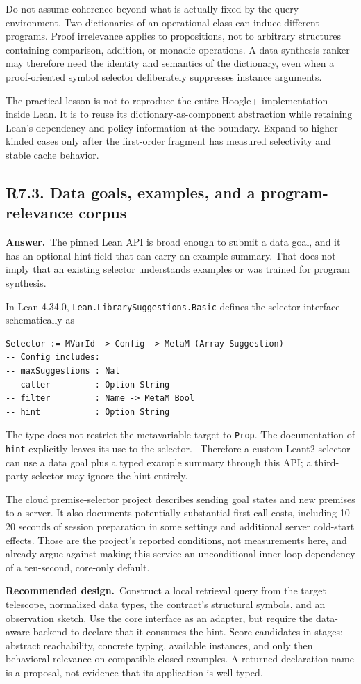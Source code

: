 \documentclass[11pt,a4paper]{article}
\newcommand{\code}[1]{\nolinkurl{#1}}
\newcommand{\qid}[3]{\subsection{#2. #3}\label{#1}}
\newcommand{\answer}{\noindent\textbf{Answer.}\ }
\newcommand{\proposal}{\noindent\textbf{Recommended design.}\ }
\theoremstyle{remark}
\begin{document}
Do not assume coherence beyond what is actually fixed by the query environment. Two dictionaries of an operational class can induce different programs. Proof irrelevance applies to propositions, not to arbitrary structures containing comparison, addition, or monadic operations. A data-synthesis ranker may therefore need the identity and semantics of the dictionary, even when a proof-oriented symbol selector deliberately suppresses instance arguments.

The practical lesson is not to reproduce the entire Hoogle+ implementation inside Lean. It is to reuse its dictionary-as-component abstraction while retaining Lean's dependency and policy information at the boundary. Expand to higher-kinded cases only after the first-order fragment has measured selectivity and stable cache behavior.

\qid{q73}{R7.3}{Data goals, examples, and a program-relevance corpus}
\answer The pinned Lean API is broad enough to submit a data goal, and it has an optional hint field that can carry an example summary. That does not imply that an existing selector understands examples or was trained for program synthesis.

In Lean 4.34.0, \code{Lean.LibrarySuggestions.Basic} defines the selector interface schematically as
\begin{lstlisting}
Selector := MVarId -> Config -> MetaM (Array Suggestion)
-- Config includes:
-- maxSuggestions : Nat
-- caller         : Option String
-- filter         : Name -> MetaM Bool
-- hint           : Option String
\end{lstlisting}
The type does not restrict the metavariable target to \code{Prop}. The documentation of \code{hint} explicitly leaves its use to the selector.~\cite{suggestions} Therefore a custom Leant2 selector can use a data goal plus a typed example summary through this API; a third-party selector may ignore the hint entirely.

The cloud premise-selector project describes sending goal states and new premises to a server. It also documents potentially substantial first-call costs, including 10--20 seconds of session preparation in some settings and additional server cold-start effects. Those are the project's reported conditions, not measurements here, and already argue against making this service an unconditional inner-loop dependency of a ten-second, core-only default.~\cite{premisereadme}

\proposal Construct a local retrieval query from the target telescope, normalized data types, the contract's structural symbols, and an observation sketch. Use the core interface as an adapter, but require the data-aware backend to declare that it consumes the hint. Score candidates in stages: abstract reachability, concrete typing, available instances, and only then behavioral relevance on compatible closed examples. A returned declaration name is a proposal, not evidence that its application is well typed.
\end{document}
